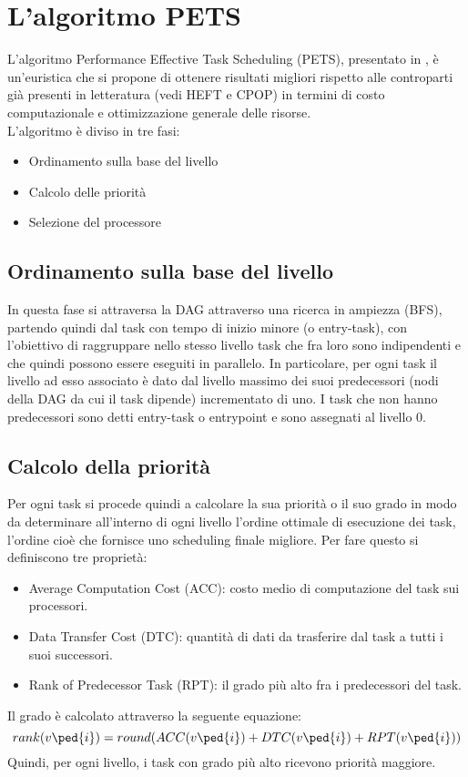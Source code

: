 \chapter{L'algoritmo PETS}
\vspace{4cm}
L'algoritmo Performance Effective Task Scheduling (PETS), presentato in \cite{ilavarasan2007low}, è un'euristica che si propone di ottenere risultati migliori rispetto alle controparti già presenti in letteratura (vedi HEFT\cite{993206} e CPOP\cite{993206}) in termini di costo computazionale e ottimizzazione generale delle risorse.
\\
L'algoritmo è diviso in tre fasi:
\begin{itemize}
	\item Ordinamento sulla base del livello
	\item Calcolo delle priorità
	\item Selezione del processore 
\end{itemize}

\newpage

\section{Ordinamento sulla base del livello}
In questa fase si attraversa la DAG attraverso una ricerca in ampiezza (BFS), partendo quindi dal task con tempo di inizio minore (o entry-task), con l'obiettivo di raggruppare nello stesso livello task che fra loro sono indipendenti e che quindi possono essere eseguiti in parallelo.
In particolare, per ogni task il livello ad esso associato è dato dal livello massimo dei suoi predecessori (nodi della DAG da cui il task dipende) incrementato di uno. I task che non hanno predecessori sono detti entry-task o entrypoint e sono assegnati al livello 0.


\section{Calcolo della priorità}
Per ogni task si procede quindi a calcolare la sua priorità o il suo grado in modo da determinare all'interno di ogni livello l'ordine ottimale di esecuzione dei task, l'ordine cioè che fornisce uno scheduling finale migliore.
Per fare questo si definiscono tre proprietà:
\begin{itemize}
	\item Average Computation Cost (ACC): costo medio di computazione del task sui processori.
	\item Data Transfer Cost (DTC): quantità di dati da trasferire dal task a tutti i suoi successori.
	\item Rank of Predecessor Task (RPT): il grado più alto fra i predecessori del task.
\end{itemize}
Il grado è calcolato attraverso la seguente equazione:
\begin{equation}\label{Grado}
	rank(v\ped{i}) = round(ACC(v\ped{i}) + DTC(v\ped{i}) + RPT(v\ped{i}))
\end{equation}
Quindi, per ogni livello, i task con grado più alto ricevono priorità maggiore.



